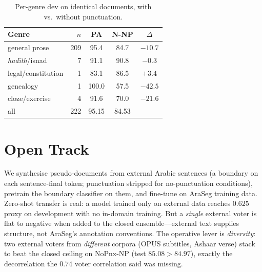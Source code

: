 \begin{table}[t]\centering\small
\begin{tabular}{lrccc}
\toprule
Genre & $n$ & PA & N-NP & $\Delta$ \\
\midrule
general prose       & 209 & 95.4 & 84.7 & $-10.7$ \\
\textit{had{\=\i}th}/isnad & 7 & 91.1 & 90.8 & $-0.3$ \\
legal/constitution  & 1   & 83.1 & 86.5 & $+3.4$ \\
genealogy           & 1   & 100.0 & 57.5 & $-42.5$ \\
cloze/exercise      & 4   & 91.6 & 70.0 & $-21.6$ \\
\midrule
all                 & 222 & 95.15 & 84.53 & \\
\bottomrule
\end{tabular}
\caption{Per-genre dev \fone{} on identical documents, with vs.\ without punctuation.}
\label{tab:genre}
\end{table}

\section{Open Track}\label{sec:open}
We synthesise pseudo-documents from external Arabic sentences (a boundary on each
sentence-final token; punctuation stripped for no-punctuation conditions), pretrain
the boundary classifier on them, and fine-tune on AraSeg training data. Zero-shot
transfer is real: a model trained only on external data reaches $0.625$ proxy \fone{}
on development with no in-domain training. But a \emph{single} external voter is flat
to negative when added to the closed ensemble---external text supplies structure, not
AraSeg's annotation conventions. The operative lever is \emph{diversity}: two external
voters from \emph{different} corpora (OPUS subtitles, Ashaar verse) stack to beat the
closed ceiling on NoPnx-NP (test $85.08{>}84.97$), exactly the decorrelation the
$0.74$ voter correlation said was missing.

